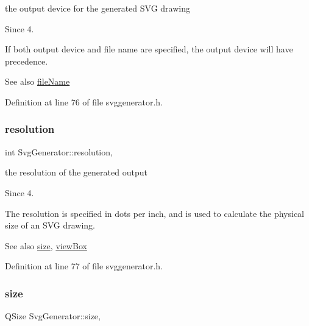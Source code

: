 the output device for the generated S\+VG drawing 

\begin{DoxySince}{Since}
4.
\end{DoxySince}
If both output device and file name are specified, the output device will have precedence.

\begin{DoxySeeAlso}{See also}
\hyperlink{class_svg_generator_a4f72398a28e315c9192a611e16f8b693}{file\+Name} 
\end{DoxySeeAlso}


Definition at line 76 of file svggenerator.\+h.

\mbox{\label{class_svg_generator_a3d8c9548b882f99b74b011e965b01a2e}} 
\subsubsection{\texorpdfstring{resolution}{resolution}}
{\footnotesize\ttfamily int Svg\+Generator\+::resolution\hspace{0.3cm}{\ttfamily [read]}, {\ttfamily [write]}}



the resolution of the generated output 

\begin{DoxySince}{Since}
4.
\end{DoxySince}
The resolution is specified in dots per inch, and is used to calculate the physical size of an S\+VG drawing.

\begin{DoxySeeAlso}{See also}
\hyperlink{class_svg_generator_acc6cf7b4596fb1c19ce95d45aac00124}{size}, \hyperlink{class_svg_generator_a4a56c80b10833a8ded8715652d67afe2}{view\+Box} 
\end{DoxySeeAlso}


Definition at line 77 of file svggenerator.\+h.

\mbox{\label{class_svg_generator_acc6cf7b4596fb1c19ce95d45aac00124}} 
\subsubsection{\texorpdfstring{size}{size}}
{\footnotesize\ttfamily Q\+Size Svg\+Generator\+::size\hspace{0.3cm}{\ttfamily [read]}, {\ttfamily [write]}}



